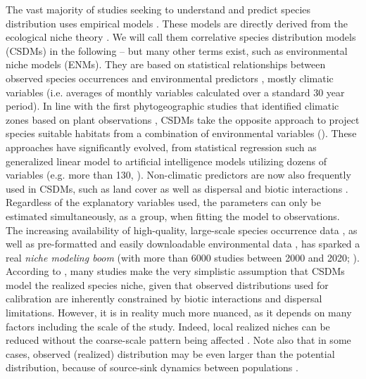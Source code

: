 The vast majority of studies seeking to understand and predict species distribution uses empirical models \citep{Dormann2012}. These models are directly derived from the ecological niche theory \citep{Guisan2000, Guisan2005}. We will call them correlative species distribution models (CSDMs) in the following -- but many other terms exist, such as environmental niche models (ENMs). They are based on statistical relationships between observed species occurrences and environmental predictors \citep{Elith2009}, mostly climatic variables (i.e. averages of monthly variables calculated over a standard 30 year period). In line with the first phytogeographic studies that identified climatic zones based on plant observations \citep{DeCandolle1820}, CSDMs take the opposite approach to project species suitable habitats from a combination of environmental variables (). These approaches have significantly evolved, from statistical regression such as generalized linear model \citep{Thuiller2009} to artificial intelligence models utilizing dozens of variables (e.g. more than 130, \citealp{Steiner2024}). Non-climatic predictors are now also frequently used in CSDMs, such as land cover \citep{Thuiller2004, Ay2017} as well as dispersal and biotic interactions \citep{Boulangeat2012, Palacio2018}. Regardless of the explanatory variables used, the parameters can only be estimated simultaneously, as a group, when fitting the model to observations. \\
The increasing availability of high-quality, large-scale species occurrence data \citep[e.g.][]{Mauri2017}, as well as pre-formatted and easily downloadable environmental data \citep[e.g.][]{Fick2017}, has sparked a real \emph{niche modeling boom} (with more than 6000 studies between 2000 and 2020; \citealp{Araujo2019}). According to \citet{Guisan2005}, many studies make the very simplistic assumption that CSDMs model the realized species niche, given that observed distributions used for calibration are inherently constrained by biotic interactions and dispersal limitations. However, it is in reality much more nuanced, as it depends on many factors including the scale of the study. Indeed, local realized niches can be reduced without the coarse-scale pattern being affected \citep{Soberon2007}. Note also that in some cases, observed (realized) distribution may be even larger than the potential distribution, because of source-sink dynamics between populations \citep{Pulliam2000}.

